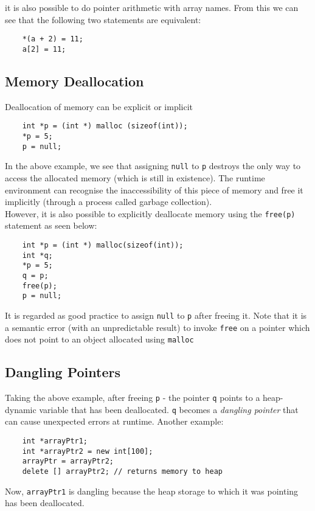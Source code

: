 it is also possible to do pointer arithmetic with array names. From this we can see that the following two statements are equivalent:
\begin{verbatim}
    *(a + 2) = 11;
    a[2] = 11;
\end{verbatim}

\subsection{Memory Deallocation}
Deallocation of memory can be explicit or implicit
\begin{verbatim}
    int *p = (int *) malloc (sizeof(int));
    *p = 5;
    p = null;
\end{verbatim}
In the above example, we see that assigning \verb|null| to \verb|p| destroys the only way to access the allocated memory (which is still in existence). The runtime environment can recognise the inaccessibility of this piece of memory and free it implicitly (through a process called garbage collection).\\

However, it is also possible to explicitly deallocate memory using the \verb|free(p)| statement as seen below:
\begin{verbatim}
    int *p = (int *) malloc(sizeof(int));
    int *q;
    *p = 5;
    q = p;
    free(p);
    p = null;
\end{verbatim}
It is regarded as good practice to assign \verb|null| to \verb|p| after freeing it. Note that it is a semantic error (with an unpredictable result) to invoke \verb|free| on a pointer which does not point to an object allocated using \verb|malloc|

\subsection{Dangling Pointers}
Taking the above example, after freeing \verb|p| - the pointer \verb|q| points to a heap-dynamic variable that has been deallocated. \verb|q| becomes a \textit{dangling pointer} that can cause unexpected errors at runtime. Another example:
\begin{verbatim}
    int *arrayPtr1;
    int *arrayPtr2 = new int[100];
    arrayPtr = arrayPtr2;
    delete [] arrayPtr2; // returns memory to heap
\end{verbatim}
Now, \verb|arrayPtr1| is dangling because the heap storage to which it was pointing has been deallocated.